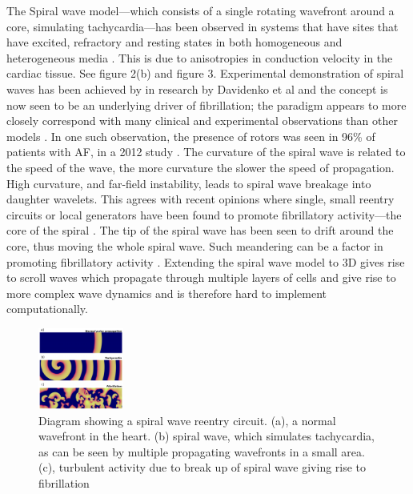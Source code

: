 \documentclass[twocolumn, a1paper]{article}
\begin{document}
The Spiral wave model---which consists of a single rotating wavefront around a core, simulating tachycardia---has been observed in systems that have sites that have excited, refractory and resting states in both homogeneous and heterogeneous media \cite{Greenburg} \cite{Bub}. This is due to anisotropies in conduction velocity in the cardiac tissue. See figure 2(b) and figure 3. %
 Experimental demonstration of spiral waves has been achieved by in research by Davidenko et al and the concept is now seen to be an underlying driver of fibrillation; the paradigm appears to more closely correspond with many clinical and experimental observations than other models \cite{Davidenko} \cite{Comtois}. In one such observation, the presence of rotors was seen in 96\% of patients with AF, in a 2012 study \cite{afstudy}. The curvature of the spiral wave is related to the speed of the wave, the more curvature the slower the speed of propagation. High curvature, and far-field instability, leads to spiral wave breakage into daughter wavelets. This agrees with
recent opinions where single, small reentry circuits or local generators have been found to promote fibrillatory activity---the core of the spiral \cite{Skanes} \cite{Nattel2}. The tip of the spiral wave has been seen to drift around the core, thus moving the whole spiral wave. Such meandering can be a factor in promoting fibrillatory activity \cite{Tusscher}.
 Extending the spiral wave model to 3D gives rise to scroll waves which propagate through multiple layers of cells and give rise to more complex wave dynamics and is therefore hard to implement computationally.  %


\begin{figure}
\caption[short title]{Diagram showing a spiral wave reentry circuit. (a), a normal wavefront in the heart. (b) spiral wave, which simulates tachycardia, as can be seen by multiple propagating wavefronts in a small area. (c), turbulent activity due to break up of spiral wave giving rise to fibrillation \cite{Alonso}}
\centering
\includegraphics[width = 0.25\textwidth]{spiralbreak2tachy}
\end{figure}
\end{document}
